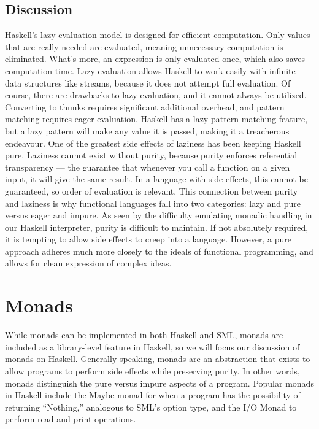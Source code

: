 \documentclass[journal]{IEEEtran}
\begin{document}
\subsection*{Discussion}
Haskell's lazy evaluation model is designed for efficient computation. Only values that are really needed are evaluated, meaning unnecessary computation is eliminated. What's more, an expression is only evaluated once, which also saves computation time. Lazy evaluation allows Haskell to work easily with infinite data structures like streams, because it does not attempt full evaluation. Of course, there are drawbacks to lazy evaluation, and it cannot always be utilized. Converting to thunks requires significant additional overhead, and pattern matching requires eager evaluation. Haskell has a lazy pattern matching feature, but a lazy pattern will make any value it is passed, making it a treacherous endeavour. One of the greatest side effects of laziness has been keeping Haskell pure. Laziness cannot exist without purity, because purity enforces referential transparency — the guarantee that whenever you call a function on a given input, it will give the same result. In a language with side effects, this cannot be guaranteed, so order of evaluation is relevant. This connection between purity and laziness is why functional languages fall into two categories: lazy and pure versus eager and impure. As seen by the difficulty emulating monadic handling in our Haskell interpreter, purity is difficult to maintain. If not absolutely required, it is tempting to allow side effects to creep into a language. However, a pure approach adheres much more closely to the ideals of functional programming, and allows for clean expression of complex ideas.

\section{Monads}

While monads can be implemented in both Haskell and SML, monads are included as a library-level feature in Haskell, so we will focus our discussion of monads on Haskell. Generally speaking, monads are an abstraction that exists to allow programs to perform side effects while preserving purity. In other words, monads distinguish the pure versus impure aspects of a program. Popular monads in Haskell include the Maybe monad for when a program has the possibility of returning “Nothing,” analogous to SML's option type, and the I/O Monad to perform read and print operations. \\
\end{document}
